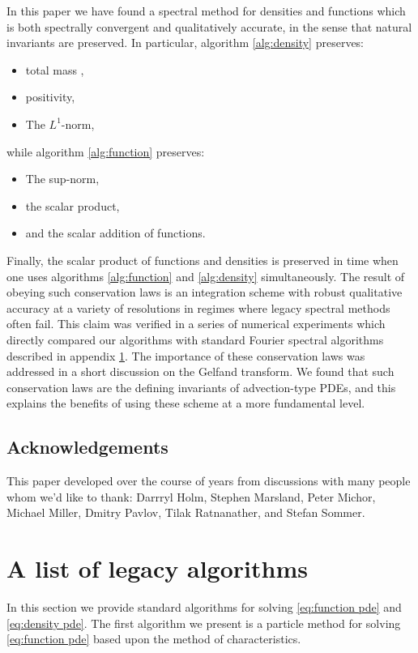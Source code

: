 \documentclass[12pt]{amsart}
\begin{document}
In this paper we have found a spectral method for densities and functions which is both spectrally convergent
and qualitatively accurate, in the sense that natural invariants are preserved.
In particular, algorithm \ref{alg:density} preserves:
\begin{itemize}
	\item total mass ,
	\item positivity,
	\item The $L^{1}$-norm,
\end{itemize}
while algorithm \ref{alg:function} preserves:
\begin{itemize}
	\item The sup-norm,
	\item the scalar product,
	\item and the scalar addition of functions.
\end{itemize}
Finally, the scalar product of functions and densities is preserved in time when one uses algorithms \ref{alg:function} and \ref{alg:density} simultaneously.
The result of obeying such conservation laws is an integration scheme with robust qualitative accuracy at a variety of resolutions in regimes where legacy spectral methods often fail.
This claim was verified in a series of numerical experiments which directly compared our algorithms with standard Fourier spectral algorithms described in appendix \ref{app:algorithms}.
The importance of these conservation laws was addressed in a short discussion on the Gelfand transform.
We found that such conservation laws are the defining invariants of advection-type PDEs, and this explains the benefits of using these scheme at a more fundamental level.


\subsection{Acknowledgements}
This paper developed over the course of years from discussions with many people whom we'd like to thank:
 	Darrryl Holm, Stephen Marsland, Peter Michor, Michael Miller, Dmitry Pavlov, Tilak Ratnanather, and Stefan Sommer.

\appendix

\section{A list of legacy algorithms}
\label{app:algorithms}
In this section we provide standard algorithms for solving \eqref{eq:function pde} and \eqref{eq:density pde}.
The first algorithm we present is a particle method for solving \ref{eq:function pde} based upon the method of characteristics.
\end{document}
